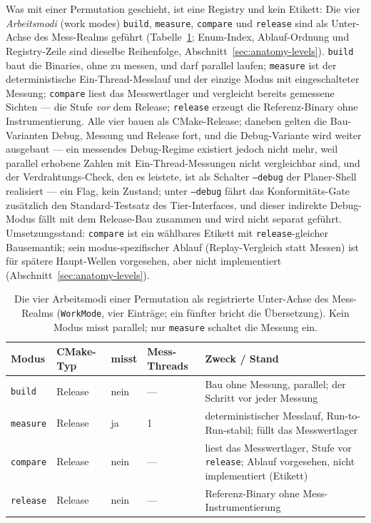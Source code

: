\begin{nurlang}
Was mit einer Permutation geschieht, ist eine Registry und kein Etikett: Die vier \emph{Arbeitsmodi}
(work modes) \texttt{build}, \texttt{measure}, \texttt{compare} und \texttt{release} sind als Unter-Achse des
Mess-Realms geführt (Tabelle~\ref{tab:work-modes}; Enum-Index, Ablauf-Ordnung und Registry-Zeile sind
dieselbe Reihenfolge, Abschnitt~\ref{sec:anatomy-levels}). \texttt{build} baut die Binaries, ohne zu messen,
und darf parallel laufen; \texttt{measure} ist der deterministische Ein-Thread-Messlauf und der einzige
Modus mit eingeschalteter Messung; \texttt{compare} liest das Messwertlager und vergleicht bereits
gemessene Sichten --- die Stufe \emph{vor} dem Release; \texttt{release} erzeugt die Referenz-Binary ohne
Instrumentierung. Alle vier bauen als CMake-Release; daneben gelten die Bau-Varianten Debug, Messung und Release fort, und die Debug-Variante wird weiter ausgebaut
--- ein messendes Debug-Regime existiert jedoch nicht mehr, weil
parallel erhobene Zahlen mit Ein-Thread-Messungen nicht vergleichbar sind, und der Verdrahtungs-Check, den
es leistete, ist als Schalter \texttt{--debug} der Planer-Shell realisiert --- ein Flag, kein Zustand;
unter \texttt{--debug} fährt das Konformitäts-Gate zusätzlich den Standard-Testsatz des Tier-Interfaces, und dieser indirekte
Debug-Modus fällt mit dem Release-Bau zusammen und wird nicht separat geführt.
Umsetzungsstand: \texttt{compare} ist ein wählbares Etikett mit \texttt{release}-gleicher Bausemantik;
sein modus-spezifischer Ablauf (Replay-Vergleich statt Messen) ist für spätere Haupt-Wellen vorgesehen, aber
nicht implementiert (Abschnitt~\ref{sec:anatomy-levels}).
\begin{table}[htbp]\centering\footnotesize
\begin{tabular}{@{}llllp{5.6cm}@{}}
\toprule
Modus & CMake-Typ & misst & Mess-Threads & Zweck / Stand \\
\midrule
\texttt{build}   & Release & nein & --- & Bau ohne Messung, parallel; der Schritt vor jeder Messung \\
\texttt{measure} & Release & ja   & 1   & deterministischer Messlauf, Run-to-Run-stabil; füllt das Messwertlager \\
\texttt{compare} & Release & nein & --- & liest das Messwertlager, Stufe vor \texttt{release}; Ablauf vorgesehen, nicht implementiert (Etikett) \\
\texttt{release} & Release & nein & --- & Referenz-Binary ohne Mess-Instrumentierung \\
\bottomrule
\end{tabular}
\caption{Die vier Arbeitsmodi einer Permutation als registrierte Unter-Achse des Mess-Realms
(\texttt{WorkMode}, vier Einträge; ein fünfter bricht die Übersetzung). Kein Modus misst parallel; nur
\texttt{measure} schaltet die Messung ein.}\label{tab:work-modes}
\end{table}
\end{nurlang}
